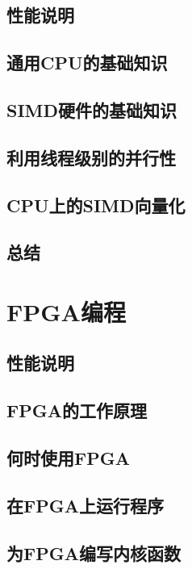 \documentclass[11pt,a4paper,UTF8]{ctexart}
\begin{document}
		\subsection{性能说明}
		
		\subsection{通用CPU的基础知识}
		
		\subsection{SIMD硬件的基础知识}
		
		\subsection{利用线程级别的并行性}
		
		\subsection{CPU上的SIMD向量化}
		
		\subsection{总结}
		
	\section{FPGA编程}
	
		\subsection{性能说明}
		
		\subsection{FPGA的工作原理}
		
		\subsection{何时使用FPGA}
		
		\subsection{在FPGA上运行程序}
		
		\subsection{为FPGA编写内核函数}
		
\end{document}

